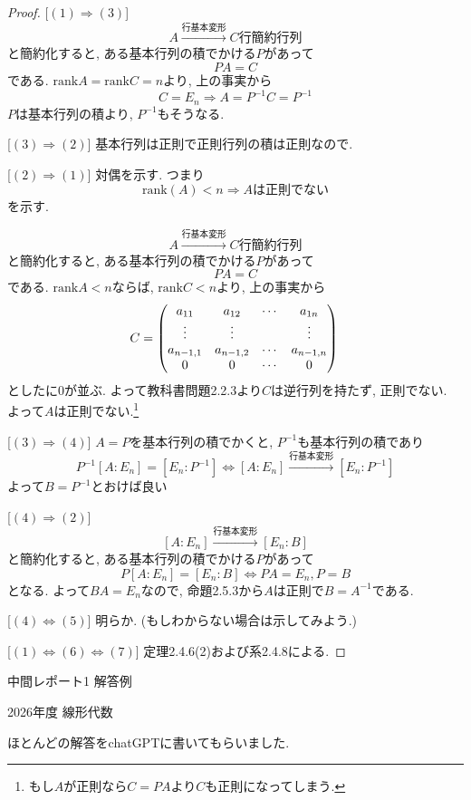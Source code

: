 \documentclass[dvipdfmx,a4paper,11pt]{article} %
\theoremstyle{definition}
\begin{document}
\begin{proof}

[$(1) \Rightarrow (3)$]
$$
A\overset{\text{行基本変形}}{\longrightarrow} C \text{行簡約行列}
$$
と簡約化すると, ある基本行列の積でかける$P$があって
$$
PA=C
$$
である. 
$\mathrm{rank}A=\mathrm{rank}C=n$より, 上の事実から
$$
C=E_n 
\Rightarrow
A=P^{-1}C=P^{-1}
$$
$P$は基本行列の積より, $P^{-1}$もそうなる.

[$(3) \Rightarrow (2)$]
基本行列は正則で正則行列の積は正則なので. 

[$(2) \Rightarrow (1)$]
対偶を示す. 
つまり
$$
\mathrm{rank}(A)<n \Rightarrow \text{$A$は正則でない}
$$
を示す. 

$$
A\overset{\text{行基本変形}}{\longrightarrow} C \text{行簡約行列}
$$
と簡約化すると, ある基本行列の積でかける$P$があって
$$
PA=C
$$
である. 
$\mathrm{rank}A<n$ならば, $\mathrm{rank}C<n$より, 上の事実から
$$
C=
\begin{pmatrix}
a_{11} & a_{12} & \cdots & a_{1n} \\
\vdots & \vdots & & \vdots \\
a_{n-1,1} & a_{n-1,2} & \cdots & a_{n-1,n} \\
0& 0 & \cdots & 0
\end{pmatrix}\\
$$
としたに0が並ぶ. 
よって教科書問題2.2.3より$C$は逆行列を持たず, 正則でない. 
よって$A$は正則でない.\footnote{もし$A$が正則なら$C=PA$より$C$も正則になってしまう.}

[$(3) \Rightarrow (4)$]
$A=P$を基本行列の積でかくと, $P^{-1}$も基本行列の積であり
$$
P^{-1}[A:E_n]=[E_n : P^{-1}]
\Leftrightarrow
[A:E_n]\overset{\text{行基本変形}}{\longrightarrow} [E_n: P^{-1}] 
$$
よって$B=P^{-1}$とおけば良い

[$(4) \Rightarrow (2)$]
$$
[A:E_n]\overset{\text{行基本変形}}{\longrightarrow} [E_n:B] 
$$
と簡約化すると, ある基本行列の積でかける$P$があって
$$
P[A:E_n]=[E_n:B]
\Leftrightarrow
PA=E_n, P=B
$$
となる. 
よって$BA=E_n$なので, 命題2.5.3から$A$は正則で$B=A^{-1}$である. 

[$(4) \Leftrightarrow (5)$]
明らか. (もしわからない場合は示してみよう.)

[$(1) \Leftrightarrow (6) \Leftrightarrow (7)$]
定理2.4.6(2)および系2.4.8による.
\end{proof}

\newpage
\begin{center}
{\Large 中間レポート1 解答例}\par
\vspace{0.5em}
{\small 2026年度 線形代数}
\end{center}
ほとんどの解答をchatGPTに書いてもらいました.
\end{document}
